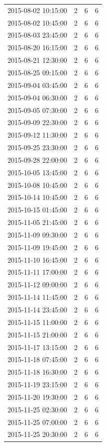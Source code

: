 \begin{tabular}{lrrr}
2015-08-02 10:15:00 & 2 & 6 & 6 \\
2015-08-02 10:45:00 & 2 & 6 & 6 \\
2015-08-03 23:45:00 & 2 & 6 & 6 \\
2015-08-20 16:15:00 & 2 & 6 & 6 \\
2015-08-21 12:30:00 & 2 & 6 & 6 \\
2015-08-25 09:15:00 & 2 & 6 & 6 \\
2015-09-04 03:45:00 & 2 & 6 & 6 \\
2015-09-04 06:30:00 & 2 & 6 & 6 \\
2015-09-05 07:30:00 & 2 & 6 & 6 \\
2015-09-09 22:30:00 & 2 & 6 & 6 \\
2015-09-12 11:30:00 & 2 & 6 & 6 \\
2015-09-25 23:30:00 & 2 & 6 & 6 \\
2015-09-28 22:00:00 & 2 & 6 & 6 \\
2015-10-05 13:45:00 & 2 & 6 & 6 \\
2015-10-08 10:45:00 & 2 & 6 & 6 \\
2015-10-14 10:45:00 & 2 & 6 & 6 \\
2015-10-15 01:45:00 & 2 & 6 & 6 \\
2015-11-05 21:45:00 & 2 & 6 & 6 \\
2015-11-09 09:30:00 & 2 & 6 & 6 \\
2015-11-09 19:45:00 & 2 & 6 & 6 \\
2015-11-10 16:45:00 & 2 & 6 & 6 \\
2015-11-11 17:00:00 & 2 & 6 & 6 \\
2015-11-12 09:00:00 & 2 & 6 & 6 \\
2015-11-14 11:45:00 & 2 & 6 & 6 \\
2015-11-14 23:45:00 & 2 & 6 & 6 \\
2015-11-15 11:00:00 & 2 & 6 & 6 \\
2015-11-15 21:00:00 & 2 & 6 & 6 \\
2015-11-17 13:15:00 & 2 & 6 & 6 \\
2015-11-18 07:45:00 & 2 & 6 & 6 \\
2015-11-18 16:30:00 & 2 & 6 & 6 \\
2015-11-19 23:15:00 & 2 & 6 & 6 \\
2015-11-20 19:30:00 & 2 & 6 & 6 \\
2015-11-25 02:30:00 & 2 & 6 & 6 \\
2015-11-25 07:00:00 & 2 & 6 & 6 \\
2015-11-25 20:30:00 & 2 & 6 & 6 \\

\end{tabular}
